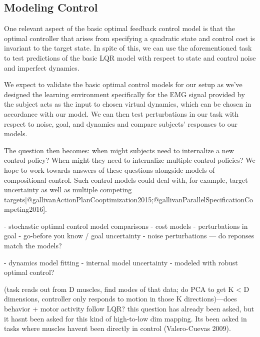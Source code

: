 \documentclass[../main.tex]{subfiles}
\begin{document}
\subsection{Modeling Control}

One relevant aspect of the basic optimal feedback control model is that the optimal controller that arises from specifying a quadratic state and control cost is invariant to the target state. In spite of this, we can use the aforementioned task to test predictions of the basic LQR model with respect to state and control noise and imperfect dynamics.

We expect to validate the basic optimal control models for our setup as we've designed the learning environment specifically for the EMG signal provided by the subject acts as the input to chosen virtual dynamics, which can be chosen in accordance with our model. We can then test perturbations in our task with respect to noise, goal, and dynamics and compare subjects' responses to our models.

The question then becomes: when might subjects need to internalize a new control policy? When might they need to internalize multiple control policies? We hope to work towards answers of these questions alongside models of compositional control. Such control models could deal with, for example, target uncertainty as well as multiple competing targets[@gallivanActionPlanCooptimization2015;@gallivanParallelSpecificationCompeting2016].

 

- stochastic optimal control model comparisons
  - cost models 
  - perturbations in goal
  - go-before you know / goal uncertainty 
  - noise perturbations --- do reponses match the models?

- dynamics model fitting
  - internal model uncertainty 
  - modeled with robust optimal control?  
 


 (task reads out from D muscles, find modes of that data; do PCA to get K < D dimensions, controller only responds to motion in those K directions)—does behavior + motor activity follow LQR? this question has already been asked, but it hasnt been asked for this kind of high-to-low dim mapping. Its been asked in tasks where muscles havent been directly in control (Valero-Cuevas 2009).  
\end{document}
